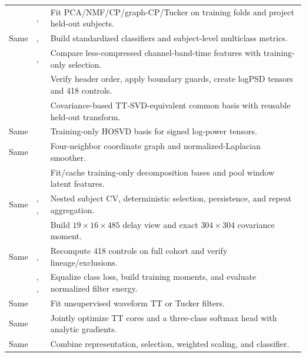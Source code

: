 \begin{longtable}{P{0.28\textwidth}P{0.23\textwidth}P{0.39\textwidth}}
 & ,  & Fit PCA/NMF/CP/graph-CP/Tucker on training folds and project held-out subjects.\\
Same & ,  & Build standardized classifiers and subject-level multiclass metrics.\\
 & ,  & Compare less-compressed channel-band-time features with training-only selection.\\
 &  & Verify header order, apply boundary guards, create logPSD tensors and 418 controls.\\
 &  & Covariance-based TT-SVD-equivalent common basis with reusable held-out transform.\\
Same &  & Training-only HOSVD basis for signed log-power tensors.\\
Same &  & Four-neighbor coordinate graph and normalized-Laplacian smoother.\\
 &  & Fit/cache training-only decomposition bases and pool window latent features.\\
Same & , ,  & Nested subject CV, deterministic selection, persistence, and repeat aggregation.\\
 &  & Build $19\times16\times485$ delay view and exact $304\times304$ covariance moment.\\
Same & ,  & Recompute 418 controls on full cohort and verify lineage/exclusions.\\
 & , ,  & Equalize class loss, build training moments, and evaluate normalized filter energy.\\
Same &  & Fit unsupervised waveform TT or Tucker filters.\\
Same &  & Jointly optimize TT cores and a three-class softmax head with analytic gradients.\\
Same &  & Combine representation, selection, weighted scaling, and classifier.\\

\end{longtable}
